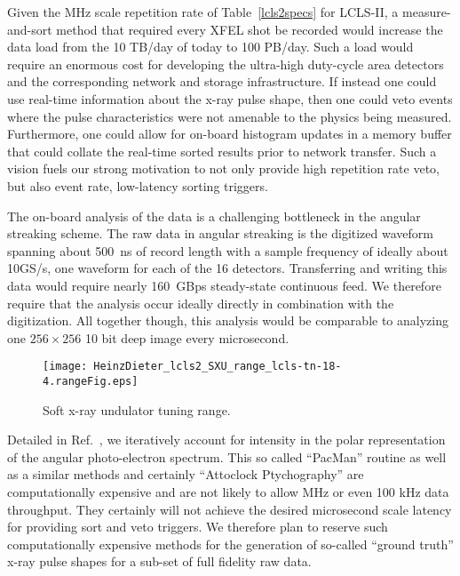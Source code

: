 Given the MHz scale repetition rate of Table~\ref{lcls2specs} for LCLS-II, a measure-and-sort method that required every XFEL shot be recorded would increase the data load from the 10 TB/day of today to 100 PB/day.
Such a load would require an enormous cost for developing the ultra-high duty-cycle area detectors and the corresponding network and storage infrastructure. 
If instead one could use real-time information about the x-ray pulse shape, then one could veto events where the pulse characteristics were not amenable to the physics being measured.
Furthermore, one could allow for on-board histogram updates in a memory buffer that could collate the real-time sorted results prior to network transfer.
Such a vision fuels our strong motivation to not only provide high repetition rate veto, but also event rate, low-latency sorting triggers.

The on-board analysis of the data is a challenging bottleneck in the angular streaking scheme.
The raw data in angular streaking is the digitized waveform spanning about 500~ns of record length with a sample frequency of ideally about 10GS/s, one waveform for each of the 16 detectors.
Transferring and writing this data would require nearly 160~GBps steady-state continuous feed.
We therefore require that the analysis occur ideally directly in combination with the digitization.
All together though, this analysis would be comparable to analyzing one $256\times256$ 10 bit deep image every microsecond.

\begin{wrapfigure}[18]{r}{3.5in}
\vspace{-1\baselineskip}
\centerline{
	\texttt{[image: HeinzDieter\_lcls2\_SXU\_range\_lcls-tn-18-4.rangeFig.eps]}
	}
\vspace{-1\baselineskip}
\caption{\label{fig::sxu_K} Soft x-ray undulator tuning range. \cite{HeinzDieter_SXU_twocolor}
	}
\end{wrapfigure}

Detailed in Ref.~\cite{Nick2018}, we iteratively account for intensity in the polar representation of the angular photo-electron spectrum.
This so called ``PacMan'' routine as well as a similar methods \cite{Thomas2015,Siqi2018,Worner2018} and certainly ``Attoclock Ptychography'' \cite{Feurer2018} are computationally expensive and are not likely to allow MHz or even 100 kHz data throughput.
They certainly will not achieve the desired microsecond scale latency for providing sort and veto triggers.
We therefore plan to reserve such computationally expensive methods for the generation of so-called ``ground truth'' x-ray pulse shapes for a sub-set of full fidelity raw data.

